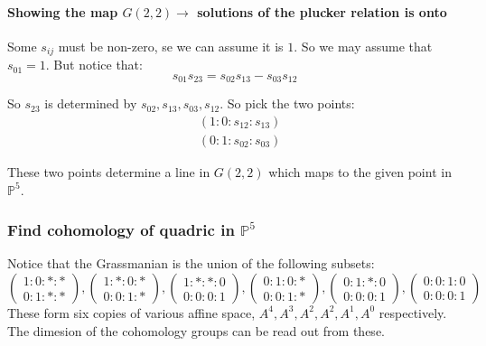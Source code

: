 \paragraph*{Showing the map $G(2,2)\rightarrow $ solutions of the plucker relation is onto}

Some $s_{ij}$ must be non-zero, se we can assume it is $1$. So we may assume that $s_{01} = 1$. But notice that:\begin{equation*}
    s_{01}s_{23} = s_{02}s_{13}-s_{03}s_{12}
\end{equation*}

So $s_{23}$ is determined by $s_{02},s_{13},s_{03},s_{12}$. So pick the two points:\begin{align*}
    &(1\colon 0\colon s_{12}\colon s_{13})\\
    &(0\colon 1 \colon s_{02}\colon s_{03})
\end{align*}

These two points determine a line in $G(2,2)$ which maps to the given point in $\mathbb{P}^5$.

\subsubsection{Find cohomology of quadric in $\mathbb{P}^5$}

Notice that the Grassmanian is the union of the following subsets:\begin{equation*}
    \begin{pmatrix}
        1\colon 0\colon \ast\colon \ast\\
        0\colon 1 \colon \ast\colon \ast
    \end{pmatrix},\begin{pmatrix}
        1\colon \ast\colon 0\colon \ast\\
        0\colon 0 \colon 1\colon \ast
    \end{pmatrix}, \begin{pmatrix}
        1\colon \ast\colon \ast\colon 0\\
        0\colon 0 \colon 0\colon 1
    \end{pmatrix}, \begin{pmatrix}
        0\colon 1\colon 0\colon \ast\\
        0\colon 0 \colon 1\colon \ast
    \end{pmatrix},
    \begin{pmatrix}
        0\colon 1\colon \ast\colon 0\\
        0\colon 0 \colon 0\colon 1
    \end{pmatrix},\begin{pmatrix}
        0\colon 0\colon 1\colon 0\\
        0\colon 0 \colon 0\colon 1
    \end{pmatrix}
\end{equation*}
These form six copies of various affine space, $A^4,A^3,A^2, A^2, A^1,A^0$ respectively. The dimesion of the cohomology groups can be read out from these.

